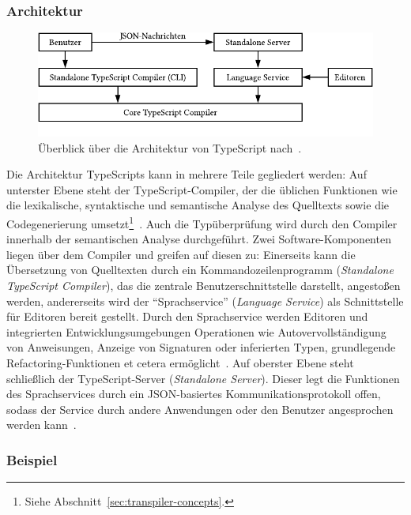 \subsubsection{Architektur}

\bigbreak
\begin{figure}[htb]
  \includegraphics[width=.75\textwidth]{src/2_Grundlagen/fig/ts-architecture.pdf}
  \caption{Überblick über die Architektur von TypeScript nach~\autocite{TYPESCRIPT:ARCHITECTURE}.}
	\label{fig:ts-architecture}
\end{figure}

Die Architektur TypeScripts kann in mehrere Teile gegliedert werden: Auf unterster Ebene steht der TypeScript-Compiler, der die üblichen Funktionen wie die lexikalische, syntaktische und semantische Analyse des Quelltexts sowie die Codegenerierung umsetzt\footnote{Siehe Abschnitt~\ref{sec:transpiler-concepts}.}~\autocite{TYPESCRIPT:ARCHITECTURE}. Auch die Typüberprüfung wird durch den Compiler innerhalb der semantischen Analyse durchgeführt. Zwei Software-Komponenten liegen über dem Compiler und greifen auf diesen zu: Einerseits kann die Übersetzung von Quelltexten durch ein Kommandozeilenprogramm (\textit{Standalone TypeScript Compiler}), das die zentrale Benutzerschnittstelle darstellt, angestoßen werden, andererseits wird der \enquote{Sprachservice} (\textit{Language Service}) als Schnittstelle für Editoren bereit gestellt. Durch den Sprachservice werden Editoren und integrierten Entwicklungsumgebungen Operationen wie Autovervollständigung von Anweisungen, Anzeige von Signaturen oder inferierten Typen, grundlegende Refactoring-Funktionen et cetera ermöglicht~\autocite{TYPESCRIPT:ARCHITECTURE}. Auf oberster Ebene steht schließlich der TypeScript-Server (\textit{Standalone Server}). Dieser legt die Funktionen des Sprachservices durch ein JSON-basiertes Kommunikationsprotokoll offen, sodass der Service durch andere Anwendungen oder den Benutzer angesprochen werden kann~\autocite{TYPESCRIPT:TSSERVER}.

\subsubsection{Beispiel}

